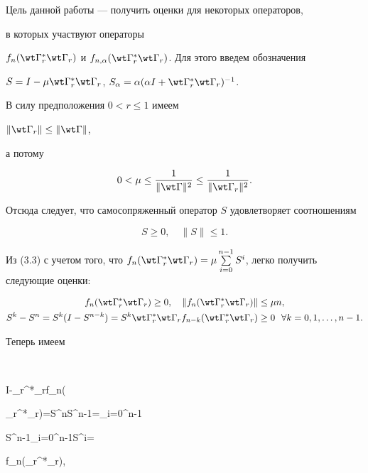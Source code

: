 Цель данной работы --- получить оценки для некоторых операторов, 


в которых участвуют операторы 


$f_n(\wt\Gamma_r^*\wt\Gamma_r)$ и $f_{n,\alpha}


(\wt\Gamma_r^*\wt\Gamma_r)$. Для этого введем обозначения


$S=I-\mu\wt\Gamma_r^*\wt\Gamma_r$, $S_\alpha=\alpha(\alpha I+


\wt\Gamma_r^*\wt\Gamma_r)^{-1}$.


В силу предположения $0<r\le 1$ имеем 


$\|\wt\Gamma_r\| \le \|\wt\Gamma\|$,


а потому 


$$


0<\mu\le \frac{1}{\|\wt\Gamma\|^2}\le \frac{1}{\|\wt\Gamma_r\|^2}.


$$


Отсюда следует, что самосопряженный оператор $S$ удовлетворяет соотношениям 


\begin{equation}


S\ge 0,\quad \|S\| \le 1.


\end{equation}


Из (3.3) с учетом того, что $f_n(\wt\Gamma_r^*\wt\Gamma_r)=\mu


\sum\limits_{i=0}^{n-1}S^i$, легко получить следующие оценки:


\begin{gather}


f_n(\wt\Gamma_r^*\wt\Gamma_r)\ge 0,\quad 


\|f_n(\wt\Gamma_r^*\wt\Gamma_r)\| \le \mu n,\\


%


S^k-S^n=S^k(I-S^{n-k})=S^k\wt\Gamma_r^*\wt\Gamma_rf_{n-k}(\wt


\Gamma_r^*\wt\Gamma_r)\ge 0\ \ \forall k=0,1,\dotsc,n-1. \notag


\end{gather}


Теперь имеем


$$


I-\wt\Gamma_r^*\wt\Gamma_rf_n(\wt


\Gamma_r^*\wt\Gamma_r)=S^n\le S^{n-1}=\sum\limits_{i=0}^{n-1}


S^{n-1}\le{}\sum\limits_{i=0}^{n-1}S^i=


f_n(\wt\Gamma_r^*\wt\Gamma_r),



